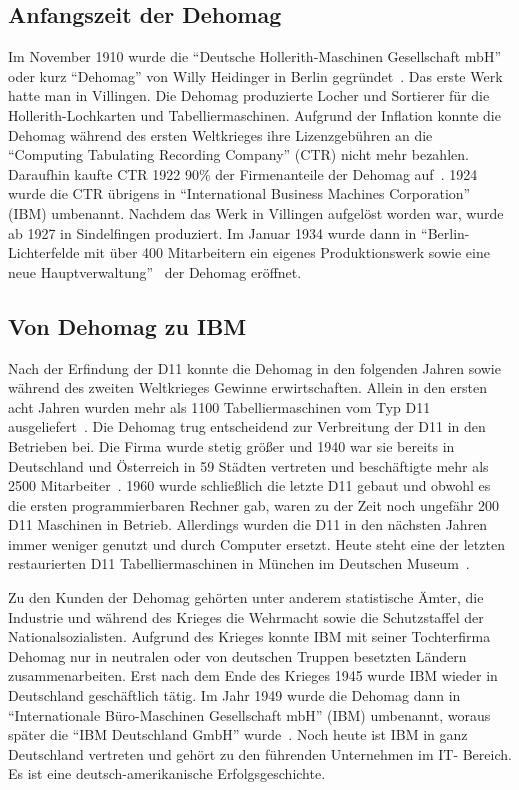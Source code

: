 \documentclass[parskip=half]{scrartcl}
\begin{document}
\subsection{Anfangszeit der Dehomag}

Im November 1910 wurde die \enquote{Deutsche Hollerith-Maschinen Gesellschaft
mbH} oder kurz \enquote{Dehomag} von Willy Heidinger in Berlin
gegründet~\cite{dingwerth}. Das erste Werk hatte man in Villingen. Die Dehomag
produzierte Locher und Sortierer für die Hollerith-Lochkarten und
Tabelliermaschinen. Aufgrund der Inflation konnte die Dehomag während des
ersten Weltkrieges ihre Lizenzgebühren an die \enquote{Computing Tabulating
Recording Company} (CTR) nicht mehr bezahlen.  Daraufhin kaufte CTR 1922 90\%
der Firmenanteile der Dehomag auf~\cite{restloseErfassung}. 1924 wurde die CTR
übrigens in \enquote{International Business Machines Corporation} (IBM)
umbenannt. Nachdem das Werk in Villingen aufgelöst worden war, wurde ab 1927 in
Sindelfingen produziert. Im Januar 1934 wurde dann in
\enquote{Berlin-Lichterfelde mit über 400 Mitarbeitern ein eigenes
Produktionswerk sowie eine neue Hauptverwaltung}~\cite{dingwerth} der Dehomag
eröffnet.

\subsection{Von Dehomag zu IBM}

Nach der Erfindung der D11 konnte die Dehomag in den folgenden Jahren sowie
während des zweiten Weltkrieges Gewinne erwirtschaften. Allein in den ersten
acht Jahren wurden mehr als 1100 Tabelliermaschinen vom Typ D11
ausgeliefert~\cite{Kist95}. Die Dehomag trug entscheidend zur Verbreitung der
D11 in den Betrieben bei. Die Firma wurde stetig größer und 1940 war sie
bereits in Deutschland und Österreich in 59 Städten vertreten und beschäftigte
mehr als 2500 Mitarbeiter~\cite{dingwerth}. 1960 wurde schließlich die
letzte D11 gebaut und obwohl es die ersten programmierbaren Rechner gab, waren
zu der Zeit noch ungefähr 200 D11 Maschinen in Betrieb. Allerdings wurden die
D11 in den nächsten Jahren immer weniger genutzt und durch Computer ersetzt.
Heute steht eine der letzten restaurierten D11 Tabelliermaschinen in München im
Deutschen Museum~\cite{Kist95}.

Zu den Kunden der Dehomag gehörten unter anderem statistische Ämter, die
Industrie und während des Krieges die Wehrmacht sowie die Schutzstaffel der
Nationalsozialisten. Aufgrund des Krieges konnte IBM mit seiner Tochterfirma
Dehomag nur in neutralen oder von deutschen Truppen besetzten Ländern
zusammenarbeiten. Erst nach dem Ende des Krieges 1945 wurde IBM wieder in
Deutschland geschäftlich tätig. Im Jahr 1949 wurde die Dehomag dann in
\enquote{Internationale Büro-Maschinen Gesellschaft mbH} (IBM) umbenannt,
woraus später die \enquote{IBM Deutschland GmbH} wurde~\cite{sendler}.
Noch heute ist IBM in ganz Deutschland vertreten und gehört zu den führenden
Unternehmen im IT- Bereich. Es ist eine deutsch-amerikanische
Erfolgsgeschichte.
\end{document}
